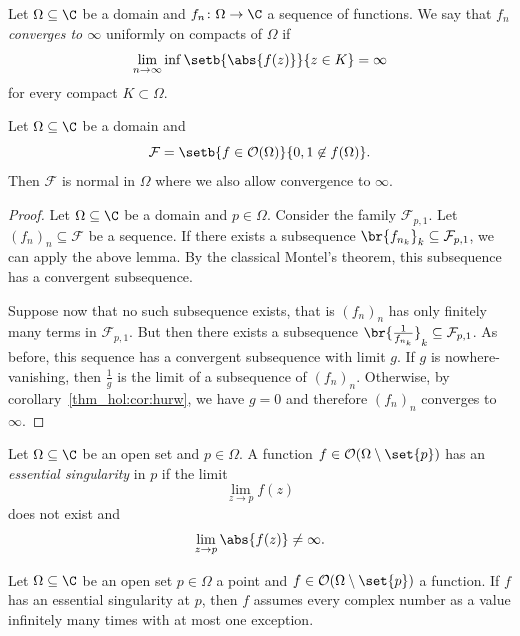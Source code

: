 \begin{definicija}
Let $\Omega \subseteq \C$ be a domain and
$f_n \colon \Omega \to \C$ a sequence of functions. We say that
$f_n$ \emph{converges to $\infty$}
uniformly on compacts of $\Omega$ if
\[
\lim_{n \to \infty} \inf \setb{\abs{f(z)}}{z \in K} = \infty
\]
for every compact $K \subset \Omega$.
\end{definicija}

\begin{izrek}
Let $\Omega \subseteq \C$ be a domain and
\[
\mathcal{F} =
\setb{f \in \mathcal{O}(\Omega)}{0, 1 \not \in f(\Omega)}.
\]
Then $\mathcal{F}$ is normal in $\Omega$ where we also allow
convergence to $\infty$.
\end{izrek}

\begin{proof}
Let $\Omega \subseteq \C$ be a domain and $p \in \Omega$. Consider
the family $\mathcal{F}_{p,1}$. Let $(f_n)_n \subseteq \mathcal{F}$
be a sequence. If there exists a subsequence
$\br{f_{n_k}}_k \subseteq \mathcal{F}_{p,1}$, we can apply the
above lemma. By the classical Montel's theorem, this subsequence
has a convergent subsequence.

Suppose now that no such subsequence exists, that is $(f_n)_n$ has
only finitely many terms in $\mathcal{F}_{p,1}$. But then there
exists a subsequence
$\br{\frac{1}{f_{n_k}}}_k \subseteq \mathcal{F}_{p,1}$. As before,
this sequence has a convergent subsequence with limit $g$. If $g$
is nowhere-vanishing, then $\frac{1}{g}$ is the limit of a
subsequence of $(f_n)_n$. Otherwise, by
corollary~\ref{thm_hol:cor:hurw}, we have $g = 0$ and therefore
$(f_n)_n$ converges to $\infty$.
\end{proof}

\begin{definicija}
Let $\Omega \subseteq \C$ be an open set and $p \in \Omega$. A
function $f \in \mathcal{O}(\Omega \setminus \set{p})$ has an
\emph{essential singularity} in $p$ if
the limit
\[
\lim_{z \to p} f(z)
\]
does not exist and
\[
\lim_{z \to p} \abs{f(z)} \ne \infty.
\]
\end{definicija}

\begin{izrek}
Let $\Omega \subseteq \C$ be an open set $p \in \Omega$ a point and
$f \in \mathcal{O}(\Omega \setminus \set{p})$ a function. If $f$
has an essential singularity at $p$, then $f$ assumes every complex
number as a value infinitely many times with at most one exception.
\end{izrek}

